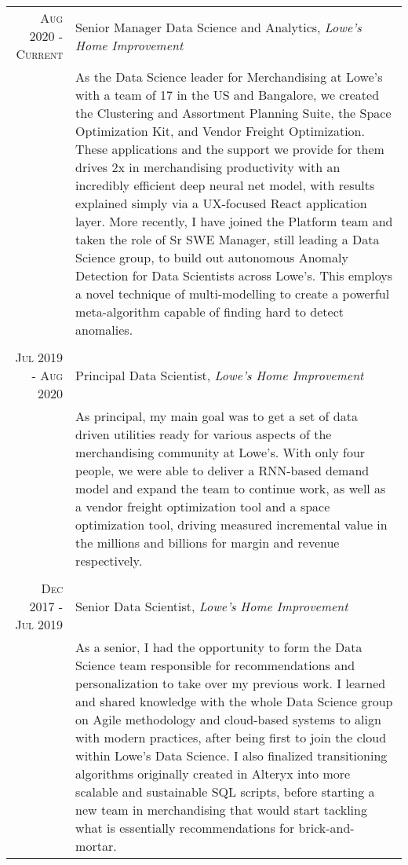 \documentclass[a4paper, 9pt]{article} %
\begin{document}
\begin{tabular}{r|p{14cm}}

\textsc{Aug 2020 - Current} & Senior Manager Data Science and Analytics, \emph{Lowe's Home Improvement} \\
& \footnotesize{As the Data Science leader for Merchandising at Lowe’s with a team of 17 in the US and Bangalore, we created the Clustering and Assortment Planning Suite, the Space Optimization Kit, and Vendor Freight Optimization. These applications and the support we provide for them drives 2x in merchandising productivity with an incredibly efficient deep neural net model, with results explained simply via a UX-focused React application layer.
More recently, I have joined the Platform team and taken the role of Sr SWE Manager, still leading a Data Science group, to build out autonomous Anomaly Detection for Data Scientists across Lowe's. This employs a novel technique of multi-modelling to create a powerful meta-algorithm capable of finding hard to detect anomalies.}\\

\multicolumn{2}{c}{} \\


\textsc{Jul 2019 - Aug 2020} & Principal Data Scientist, \emph{Lowe's Home Improvement} \\
& \footnotesize{As principal, my main goal was to get a set of data driven utilities ready for various aspects of the merchandising community at Lowe’s.
With only four people, we were able to deliver a RNN-based demand model and expand the team to continue work, as well as a vendor freight optimization tool and a space optimization tool, driving measured incremental value in the millions and billions for margin and revenue respectively.}\\

\multicolumn{2}{c}{} \\


\textsc{Dec 2017 - Jul 2019} & Senior Data Scientist, \emph{Lowe's Home Improvement} \\
& \footnotesize{As a senior, I had the opportunity to form the Data Science team responsible for recommendations and personalization to take over my previous work.
I learned and shared knowledge with the whole Data Science group on Agile methodology and cloud-based systems to align with modern practices, after being first to join the cloud within Lowe's Data Science.
I also finalized transitioning algorithms originally created in Alteryx into more scalable and sustainable SQL scripts, before starting a new team in merchandising that would start tackling what is essentially recommendations for brick-and-mortar.}\\


\end{tabular}
\end{document}
